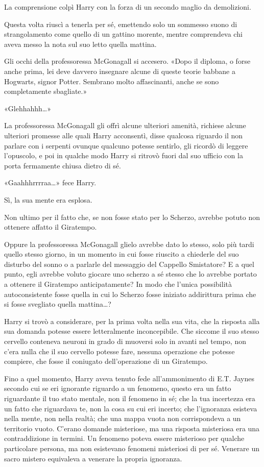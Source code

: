 La comprensione colpì Harry con la forza di un secondo maglio da demolizioni.

Questa volta riuscì a tenerla per sé, emettendo solo un sommesso suono di strangolamento come quello di un gattino morente, mentre comprendeva chi aveva messo la nota sul suo letto quella mattina.

Gli occhi della professoressa McGonagall si accesero. «Dopo il diploma, o forse anche prima, lei deve davvero insegnare alcune di queste teorie babbane a Hogwarts, signor Potter. Sembrano molto affascinanti, anche se sono completamente sbagliate.»

«Glehhahhh…»

La professoressa McGonagall gli offrì alcune ulteriori amenità, richiese alcune ulteriori promesse alle quali Harry acconsentì, disse qualcosa riguardo il non parlare con i serpenti ovunque qualcuno potesse sentirlo, gli ricordò di leggere l’opuscolo, e poi in qualche modo Harry si ritrovò fuori dal suo ufficio con la porta fermamente chiusa dietro di sé.

«Gaahhhrrrraa…» fece Harry.

Sì, la sua mente era esplosa.

Non ultimo per il fatto che, se non fosse stato per lo Scherzo, avrebbe potuto non ottenere affatto il Giratempo.

Oppure la professoressa McGonagall glielo avrebbe dato lo stesso, solo più tardi quello stesso giorno, in un momento in cui fosse riuscito a chiederle del suo disturbo del sonno o a parlarle del messaggio del Cappello Smistatore? E a quel punto, egli avrebbe voluto giocare uno scherzo a sé stesso che lo avrebbe portato a ottenere il Giratempo anticipatamente? In modo che l’unica possibilità autoconsistente fosse quella in cui lo Scherzo fosse iniziato addirittura prima che si fosse svegliato quella mattina…?

Harry si trovò a considerare, per la prima volta nella sua vita, che la risposta alla sua domanda potesse essere letteralmente inconcepibile. Che siccome il suo stesso cervello conteneva neuroni in grado di muoversi solo in avanti nel tempo, non c’era nulla che il suo cervello potesse fare, nessuna operazione che potesse compiere, che fosse il coniugato dell’operazione di un Giratempo.

Fino a quel momento, Harry aveva tenuto fede all’ammonimento di E.T. Jaynes secondo cui se eri ignorante riguardo a un fenomeno, questo era un fatto riguardante il tuo stato mentale, non il fenomeno in sé; che la tua incertezza era un fatto che riguardava te, non la cosa su cui eri incerto; che l’ignoranza esisteva nella mente, non nella realtà; che una mappa vuota non corrispondeva a un territorio vuoto. C’erano domande misteriose, ma una risposta misteriosa era una contraddizione in termini. Un fenomeno poteva essere misterioso per qualche particolare persona, ma non esistevano fenomeni misteriosi di per sé. Venerare un sacro mistero equivaleva a venerare la propria ignoranza.

